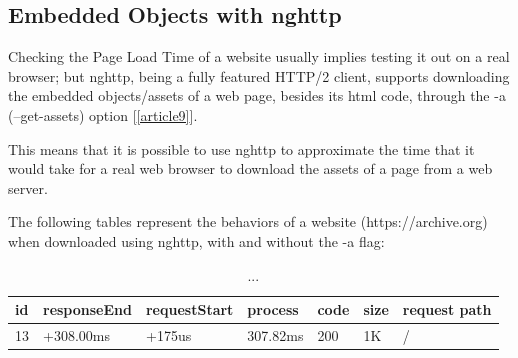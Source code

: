 \documentclass[a4paper,10pt]{article}
\begin{document}
\subsection{Embedded Objects with nghttp}


Checking the Page Load Time of a website usually implies testing it out on a real browser; but nghttp, being a fully featured HTTP/2 client, supports downloading the embedded objects/assets of a web page, besides its html code, through the -a (--get-assets) option [\ref{article9}]. 


This means that it is possible to use nghttp to approximate the time that it would take for a real web browser to download the assets of a page from a web server. 

The following tables represent the behaviors of a website (https://archive.org) when downloaded using nghttp, with and without the -a flag:



\begin{table}[h!]
\centering
\begin{tabular}{|l|l|l|l|l|l|l|}
\hline
id & responseEnd & requestStart & process  & code & size & request path \\ \hline
13 & +308.00ms   & +175us       & 307.82ms & 200  & 1K   & /            \\ \hline

\end{tabular}

\caption{...}
\label{fig:table6}
\end{table}
\end{document}
